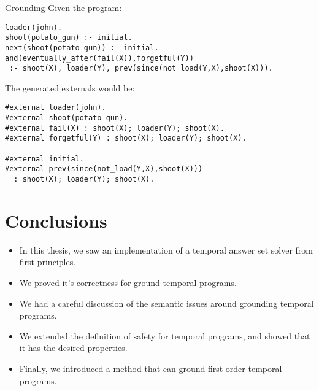 \documentclass[aspectratio=169,xcolor=svgnames]{beamer}
\theoremstyle{theoremstyle_space}
\begin{document}
\begin{frame}[t,fragile]{Grounding}
Given the program:
\begin{lstlisting}[language=clingo,numbers=none]
loader(john).
shoot(potato_gun) :- initial.
next(shoot(potato_gun)) :- initial.
and(eventually_after(fail(X)),forgetful(Y)) 
 :- shoot(X), loader(Y), prev(since(not_load(Y,X),shoot(X))).
  \end{lstlisting}
The generated externals would be:
  \begin{lstlisting}[numbers=none]
#external loader(john).
#external shoot(potato_gun).
#external fail(X) : shoot(X); loader(Y); shoot(X).
#external forgetful(Y) : shoot(X); loader(Y); shoot(X).

#external initial.
#external prev(since(not_load(Y,X),shoot(X))) 
  : shoot(X); loader(Y); shoot(X).
  \end{lstlisting}
\end{frame}

\section{Conclusions}

\begin{frame}
  \begin{itemize}
  \item In this thesis, we saw an implementation of a temporal answer
    set solver from first principles.
  \item We proved it's correctness for ground temporal programs.
  \item We had a careful discussion of the semantic issues around
    grounding temporal programs.
  \item We extended the definition of safety for temporal programs,
    and showed that it has the desired properties.
  \item Finally, we introduced a method that can ground first order temporal programs.
  \end{itemize}
\end{frame}
\end{document}
